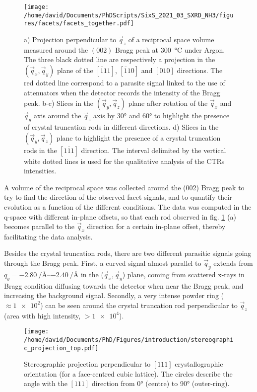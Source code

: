 \begin{figure}[!htb]
    \centering
    \texttt{[image: /home/david/Documents/PhDScripts/SixS\_2021\_03\_SXRD\_NH3/figures/facets/facets\_together.pdf]}
    \caption{
        a) Projection perpendicular to $\vec{q}_z$ of a reciprocal space volume measured around the $(002)$ Bragg peak at \qty{300}{\degreeCelsius} under Argon.
        The three black dotted line are respectively a projection in the $(\vec{q}_x, \vec{q}_y)$ plane of the $[\bar{1}11]$, $[\bar{1}10]$ and $[010]$ directions.
        The red dotted line correspond to a parasite signal linked to the use of attenuators when the detector records the intensity of the Bragg peak.
        b-c) Slices in the $(\vec{q}_y, \vec{q}_z)$ plane after rotation of the $\vec{q}_x$ and $\vec{q}_y$ axis around the $\vec{q}_z$ axis by \ang{30} and \ang{60} to highlight the presence of crystal truncation rods in different directions.
        d) Slices in the $(\vec{q}_y, \vec{q}_z)$ plane to highlight the presence of a crystal truncation rods in the $[1\bar{1}1]$ direction.
        The interval delimited by the vertical white dotted lines is used for the qualitative analysis of the CTRs intensities.
    }
    \label{fig:FacetMaps}
\end{figure}

A volume of the reciprocal space was collected around the (002) Bragg peak to try to find the direction of the observed facet signals, and to quantify their evolution as a function of the different conditions.
The data was computed in the q-space with different in-plane offsets, so that each rod observed in fig. \ref{fig:FacetMaps} (a) becomes parallel to the $\vec{q}_x$ direction for a certain in-plane offset, thereby facilitating the data analysis.

Besides the crystal truncation rods, there are two different parasitic signals going through the Bragg peak.
First, a curved signal almost parallel to $\vec{q}_y$ extends from $q_y = \qtyrange{-2.80}{-2.40}{\per\angstrom}$ in the ($\vec{q}_x, \vec{q}_y$) plane, coming from scattered x-rays in Bragg condition diffusing towards the detector when near the Bragg peak, and increasing the background signal.
Secondly, a very intense powder ring ($\approx \num{1e2}$) can be seen around the crystal truncation rod perpendicular to $\vec{q}_z$ (area with high intensity, $> \num{1e4}$).

\begin{figure}[!htb]
    \centering
    \texttt{[image: /home/david/Documents/PhD/Figures/introduction/stereographic\_projection\_top.pdf]}
    \caption{
        Stereographic projection perpendicular to $[111]$ crystallographic orientation (for a face-centred cubic lattice).
        The circles describe the angle with the $[111]$ direction from \ang{0} (centre) to \ang{90} (outer-ring).
    }
    \label{fig:StereoTop}
\end{figure}

